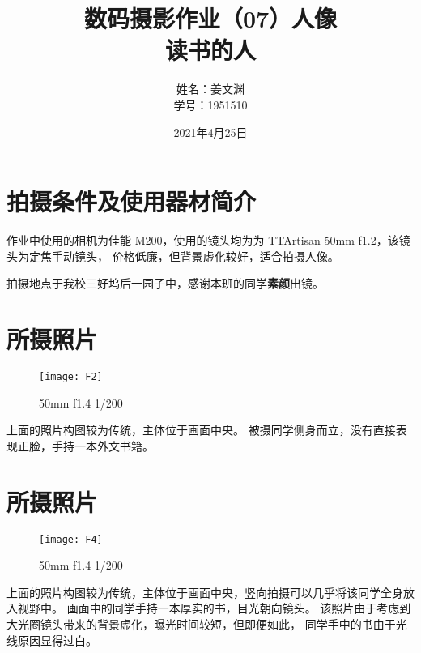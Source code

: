 \documentclass[cn,black,9pt,normal]{elegantnote}
\title{数码摄影作业（07）人像\\\small{读书的人}}
\author{姓名：姜文渊\\学号：1951510}
\date{2021年4月25日}
\begin{document}
\maketitle


\section*{拍摄条件及使用器材简介}

作业中使用的相机为佳能 M200，使用的镜头均为为 TTArtisan 50mm f1.2，该镜头为定焦手动镜头，
价格低廉，但背景虚化较好，适合拍摄人像。

拍摄地点于我校三好坞后一园子中，感谢本班的同学\textbf{素颜}出镜。




\section{所摄照片}
\begin{figure}[H]
    \centering
    \texttt{[image: F2]}
    \caption{50mm f1.4 1/200}
    \label{F-02}
\end{figure}

上面的照片构图较为传统，主体位于画面中央。
被摄同学侧身而立，没有直接表现正脸，手持一本外文书籍。




\section{所摄照片}
\begin{figure}[H]
    \centering
    \texttt{[image: F4]}
    \caption{50mm f1.4 1/200}
    \label{F-01}
\end{figure}

上面的照片构图较为传统，主体位于画面中央，竖向拍摄可以几乎将该同学全身放入视野中。
画面中的同学手持一本厚实的书，目光朝向镜头。
该照片由于考虑到大光圈镜头带来的背景虚化，曝光时间较短，但即便如此，
同学手中的书由于光线原因显得过白。

\end{document}
